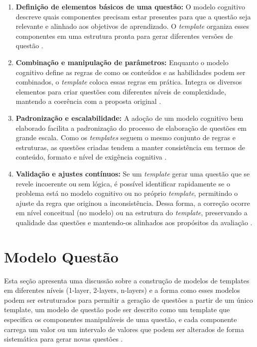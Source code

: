 \begin{enumerate} \item \textbf{Definição de elementos básicos de uma questão:} O modelo cognitivo descreve quais componentes  precisam estar presentes para que a questão seja relevante e alinhado aos objetivos de aprendizado. O \textit{template} organiza esses componentes em uma estrutura pronta para gerar diferentes versões de questão \parencite{lane2016}.

\item \textbf{Combinação e manipulação de parâmetros:}
Enquanto o modelo cognitivo define as regras de como os conteúdos e as habilidades podem ser combinados, o \textit{template} coloca essas regras em prática. Integra os diversos elementos para criar questões com diferentes níveis de complexidade, mantendo a coerência com a proposta original \parencite{embretson2017}.

\item \textbf{Padronização e escalabilidade:}
A adoção de um modelo cognitivo bem elaborado facilita a padronização do processo de elaboração de questões em grande escala. Como os \textit{templates} seguem o mesmo conjunto de regras e estruturas, as questões criadas tendem a manter consistência em termos de conteúdo, formato e nível de exigência cognitiva \parencite{gierl2017}.

\item \textbf{Validação e ajustes contínuos:}
Se um \textit{template} gerar uma questão que se revele incoerente ou sem lógica, é possível identificar rapidamente se o problema está no modelo cognitivo ou no próprio \textit{template}, permitindo o ajuste da regra que originou a inconsistência. Dessa forma, a correção ocorre em nível conceitual (no modelo) ou na estrutura do \textit{template}, preservando a qualidade das questões e mantendo-os alinhados aos propósitos da avaliação \parencite{gierlbulutzhang2018}.
\end{enumerate}


\section{Modelo Questão}

 Esta seção apresenta uma discussão sobre a construção de modelos de templates em diferentes níveis (1-layer, 2-layers, n-layers) e a forma como esses modelos podem ser estruturados para permitir a geração de questões a partir de um único template, um modelo de questão pode ser descrito como um template que especifica os componentes manipuláveis de uma questão, e cada componente carrega um valor ou um intervalo de valores que podem ser alterados de forma sistemática para gerar novas questões \parencite{gierl2021}.

